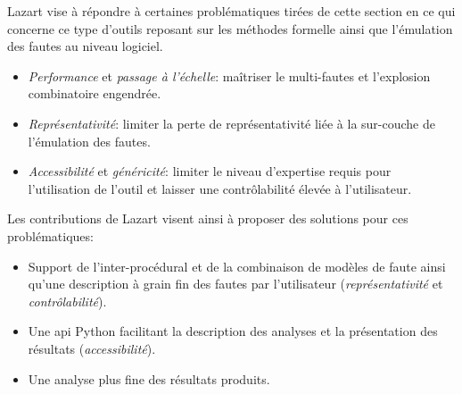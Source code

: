             Lazart vise à répondre à certaines problématiques tirées de cette section en ce qui concerne ce type d'outils reposant sur les méthodes formelle ainsi que l'émulation des fautes au niveau logiciel.
            
            \begin{itemize}
                \item \textit{Performance} et \textit{passage à l'échelle}: maîtriser le multi-fautes et l'explosion combinatoire engendrée.
                \item \textit{Représentativité}: limiter la perte de représentativité liée à la sur-couche de l'émulation des fautes.
                \item \textit{Accessibilité} et \textit{généricité}: limiter le niveau d'expertise requis pour l'utilisation de l'outil et laisser une contrôlabilité élevée à l'utilisateur.
            \end{itemize}
            
            Les contributions de Lazart visent ainsi à proposer des solutions pour ces problématiques:
            \begin{itemize}
                \item Support de l'inter-procédural et de la combinaison de modèles de faute ainsi qu'une description à grain fin des fautes par l'utilisateur (\textit{représentativité} et \textit{contrôlabilité}).
                \item Une \gls{api} Python facilitant la description des analyses et la présentation des résultats (\textit{accessibilité}).
                \item Une analyse plus fine des résultats produits.
            \end{itemize}